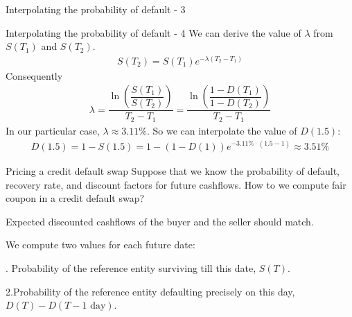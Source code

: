 \documentclass{beamer}
\begin{document}
\begin{frame}{Interpolating the probability of default - 3}
\centering
{}
\end{frame}




\begin{frame}{Interpolating the probability of default - 4}
\justify
We can derive the value of $\lambda$ from $S(T_1)$ and $S(T_2)$.
\begin{align*}
S(T_2) = S(T_1)e^{-\lambda(T_2-T_1)}
\end{align*}
Consequently
\begin{align*}
\lambda = \dfrac{\ln\left(\dfrac{S(T_1)}{S(T_2)}\right)}{T_2 - T_1} = \dfrac{\ln\left(\dfrac{1 - D(T_1)}{1 - D(T_2)}\right)}{T_2 - T_1}
\end{align*}
In our particular case, $\lambda \approx 3.11\%$. So we can interpolate the value of $D(1.5)$:
\begin{align*}
D(1.5) = 1 - S(1.5) = 1 - (1 - D(1))e^{-3.11\% \cdot (1.5 - 1)} \approx 3.51\%
\end{align*}
\end{frame}



\begin{frame}{Pricing a credit default swap}
\justify
Suppose that we know the probability of default, recovery rate, and discount factors for future cashflows. How to we compute fair coupon in a credit default swap?

\justify
Expected discounted cashflows of the buyer and the seller should match.

\justify
We compute two values for each future date:

. Probability of the reference entity surviving till this date, $S(T)$.

\justify
2.Probability of the reference entity defaulting precisely on this day, $D(T) - D(T - 1 \text{ day})$.
\end{frame}
\end{document}
